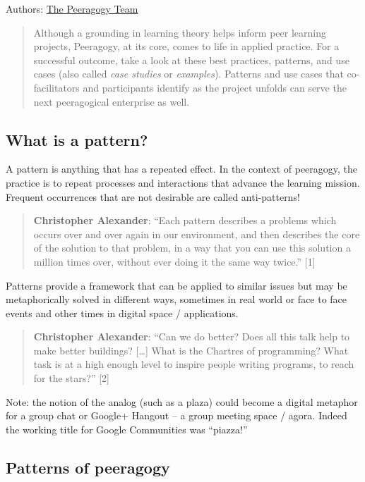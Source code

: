 Authors: \href{http://peeragogy.org/resources/meet-the-team/}{The
Peeragogy Team}

\begin{quote}
Although a grounding in learning theory helps inform peer learning
projects, Peeragogy, at its core, comes to life in applied practice. For
a successful outcome, take a look at these best practices, patterns, and
use cases (also called \emph{case studies} or \emph{examples}). Patterns
and use cases that co-facilitators and participants identify as the
project unfolds can serve the next peeragogical enterprise as well.

\end{quote}
\subsection{What is a pattern?}

A pattern is anything that has a repeated effect. In the context of
peeragogy, the practice is to repeat processes and interactions that
advance the learning mission. Frequent occurrences that are not
desirable are called anti-patterns!

\begin{quote}
\textbf{Christopher Alexander}: ``Each pattern describes a problems
which occurs over and over again in our environment, and then describes
the core of the solution to that problem, in a way that you can use this
solution a million times over, without ever doing it the same way
twice.'' {[}1{]}

\end{quote}
Patterns provide a framework that can be applied to similar issues but
may be metaphorically solved in different ways, sometimes in real world
or face to face events and other times in digital space / applications.

\begin{quote}
\textbf{Christopher Alexander}: ``Can we do better? Does all this talk
help to make better buildings? {[}\ldots{}{]} What is the Chartres of
programming? What task is at a high enough level to inspire people
writing programs, to reach for the stars?'' {[}2{]}

\end{quote}
Note: the notion of the analog (such as a plaza) could become a digital
metaphor for a group chat or Google+ Hangout -- a group meeting space /
agora. Indeed the working title for Google Communities was ``piazza!''

\subsection{Patterns of peeragogy}

